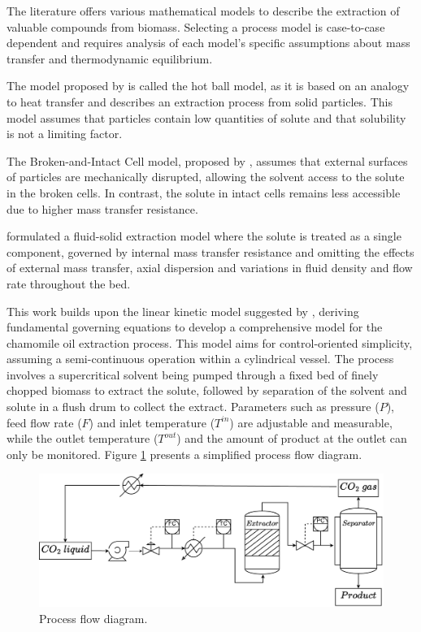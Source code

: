 \documentclass[a4paper,fleqn]{cas-dc}
\begin{document}
The literature offers various mathematical models to describe the extraction of valuable compounds from biomass. Selecting a process model is case-to-case dependent and requires analysis of each model's specific assumptions about mass transfer and thermodynamic equilibrium.

The model proposed by \citet{Reverchon1993} is called the hot ball model, as it is based on an analogy to heat transfer and describes an extraction process from solid particles. This model assumes that particles contain low quantities of solute and that solubility is not a limiting factor.

The Broken-and-Intact Cell model, proposed by \citet{Sovova1994}, assumes that external surfaces of particles are mechanically disrupted, allowing the solvent access to the solute in the broken cells. In contrast, the solute in intact cells remains less accessible due to higher mass transfer resistance.

\citet{Reverchon1996} formulated a fluid-solid extraction model where the solute is treated as a single component, governed by internal mass transfer resistance and omitting the effects of external mass transfer, axial dispersion and variations in fluid density and flow rate throughout the bed.

This work builds upon the linear kinetic model suggested by \citet{Reverchon1996}, deriving fundamental governing equations to develop a comprehensive model for the chamomile oil extraction process. This model aims for control-oriented simplicity, assuming a semi-continuous operation within a cylindrical vessel. The process involves a supercritical solvent being pumped through a fixed bed of finely chopped biomass to extract the solute, followed by separation of the solvent and solute in a flush drum to collect the extract. Parameters such as pressure ($P$), feed flow rate ($F$) and inlet temperature ($T^{in}$) are adjustable and measurable, while the outlet temperature ($T^{out}$) and the amount of product at the outlet can only be monitored. Figure \ref{fig: SFE_drawing} presents a simplified process flow diagram.

\begin{figure}[h!]
	\centering
	\includegraphics[width=\columnwidth]{Figures/PFD.drawio.pdf}
	\caption{Process flow diagram.}
	\label{fig: SFE_drawing}
\end{figure}
\end{document}
